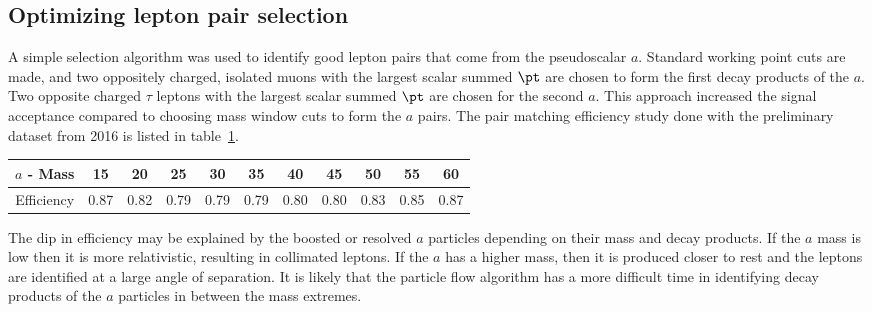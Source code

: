 \subsection{Optimizing lepton pair selection}
\label{sec:selection}
A simple selection algorithm was used to identify good lepton pairs that come from the pseudoscalar $a$. 
Standard working point cuts are made, and two oppositely charged, isolated muons with the largest scalar summed $\pt$ are chosen to form the first decay products of the $a$. 
Two opposite charged $\tau$ leptons with the largest scalar summed $\pt$ are chosen for the second $a$. 
This approach increased the signal acceptance compared to choosing mass window cuts to form the $a$ pairs. 
The pair matching efficiency study done with the preliminary dataset from 2016 is listed in table~\ref{tab:paireff}.
\begin{table}[h!tbp]
\begin{center}
    \label{tab:paireff}
\begin{tabular}{|c||c|c|c|c|c|c|c|c|c|c|}\hline
$a$ - Mass & 15     & 20    & 25    & 30    & 35    & 40    & 45    & 50    & 55    & 60 \\\hline
Efficiency & 0.87   & 0.82  &0.79   & 0.79  & 0.79  & 0.80  & 0.80  & 0.83  & 0.85  & 0.87 \\\hline 
\end{tabular}
\end{center}
\end{table}
The dip in efficiency may be explained by the boosted or resolved $a$ particles depending on their mass and decay products. If the $a$ mass is low then it is more relativistic, resulting in collimated leptons. If the $a$ has a higher mass, then it is produced closer to rest and the leptons are identified at a large angle of separation. It is likely that the particle flow algorithm has a more difficult time in identifying decay products of the $a$ particles in between the mass extremes.

